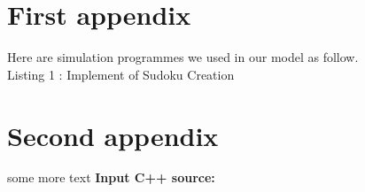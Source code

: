 \documentclass{mcmthesis}
\begin{document}
\begin{appendices}

\section{First appendix}

Here are simulation programmes we used in our model as follow.\\

\centering
Listing 1 : Implement of Sudoku Creation



\section{Second appendix}
some more text \textcolor[rgb]{0.98,0.00,0.00}{\textbf{Input C++ source:}}


\end{appendices}
\end{document}
